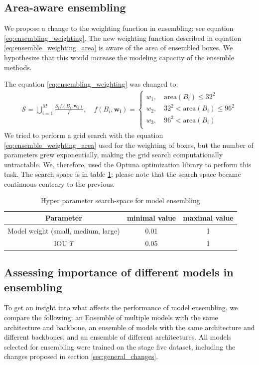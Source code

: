 \subsection{Area-aware ensembling}
\label{sec:methods_area_aware_ens}
We propose a change to the weighting function in ensembling; see equation \ref{eq:ensembling_weighting}. The new weighting function described in equation \ref{eq:ensemble_weighting_area} is aware of the area of ensembled boxes. We hypothesize that this would increase the modeling capacity of the ensemble methods.

The equation \ref{eq:ensembling_weighting} was changed to:
\begin{align}
    \mathcal{S} = \bigcup_{i=1}^{M} \frac{S_i f(B_i, \mathbf{w_i})}{ F}, \quad
    f(B_i, \mathbf{w_i}) = \begin{cases}
        w_1,\quad \text{area}(B_i) \leq 32^2        \\
        w_2,\quad 32^2 < \text{area}(B_i) \leq 96^2 \\
        w_3,\quad 96^2 < \text{area}(B_i)           \\
    \end{cases}
    \label{eq:ensemble_weighting_area}
\end{align}
We tried to perform a grid search with the equation \ref{eq:ensemble_weighting_area} used for the weighting of boxes, but the number of parameters grew exponentially, making the grid search computationally untractable. We, therefore, used the Optuna optimization library to perform this task. The search space is in table \ref{tab:ensembling_search_space_area}; please note that the search space became continuous contrary to the previous.

\begin{table}
    \centering
    \begin{tabular}{|c|c|c|}
        \hline
        Parameter                           & minimal value & maximal value \\ \hline
        Model weight (small, medium, large) & 0.01          & 1             \\ \hline
        IOU $T$                             & 0.05          & 1             \\ \hline
    \end{tabular}
    \caption{Hyper parameter search-space for model ensembling}
    \label{tab:ensembling_search_space_area}
\end{table}


\subsection{Assessing importance of different models in ensembling}
To get an insight into what affects the performance of model ensembling, we compare the following: an Ensemble of multiple models with the same architecture and backbone, an ensemble of models with the same architecture and different backbones, and an ensemble of different architectures. All models selected for ensembling were trained on the stage five dataset, including the changes proposed in section \ref{sec:general_changes}.

